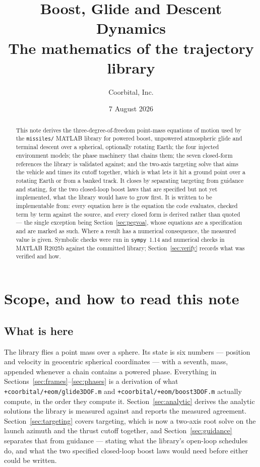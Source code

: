 \documentclass[11pt]{article}
\title{Boost, Glide and Descent Dynamics\\
       \large The mathematics of the \code{missiles/} trajectory library}
\author{Coorbital, Inc.}
\date{7 August 2026}
\newcommand{\code}[1]{\texttt{#1}}
\begin{document}
\maketitle

\begin{abstract}
This note derives the three-degree-of-freedom point-mass equations of motion
used by the \code{missiles/} MATLAB library for powered boost, unpowered
atmospheric glide and terminal descent over a spherical, optionally rotating
Earth; the four injected environment models; the phase machinery that chains
them; the seven closed-form references the library is validated against; and
the two-axis targeting solve that aims the vehicle and times its cutoff
together, which is what lets it hit a ground point over a rotating Earth or
from a banked track. It closes by separating targeting from guidance and
stating, for the two closed-loop boost laws that are specified but not yet
implemented, what the library would have to grow first.
It is written to be implementable from: every equation here is the equation the
code evaluates, checked term by term against the source, and every closed form
is derived rather than quoted --- the single exception being
Section~\ref{sec:pegvoa}, whose equations are a specification and are marked as
such. Where a result has a numerical consequence, the
measured value is given. Symbolic checks were run in \code{sympy}~1.14 and
numerical checks in MATLAB R2025b against the committed library;
Section~\ref{sec:verify} records what was verified and how.
\end{abstract}

\tableofcontents

\section{Scope, and how to read this note}

\subsection{What is here}

The library flies a point mass over a sphere. Its state is six numbers ---
position and velocity in geocentric spherical coordinates --- with a seventh,
mass, appended whenever a chain contains a powered phase. Everything in
Sections~\ref{sec:frames}--\ref{sec:phases} is a derivation of what
\code{+coorbital/+eom/glide3DOF.m} and \code{+coorbital/+eom/boost3DOF.m}
actually compute, in the order they compute it.
Section~\ref{sec:analytic} derives the analytic solutions the library is
measured against and reports the measured agreement.
Section~\ref{sec:targeting} covers targeting, which is now a two-axis root
solve on the launch azimuth and the thrust cutoff together, and
Section~\ref{sec:guidance} separates that from guidance --- stating what the
library's open-loop schedules do, and what the two specified closed-loop boost
laws would need before either could be written.
\end{document}
